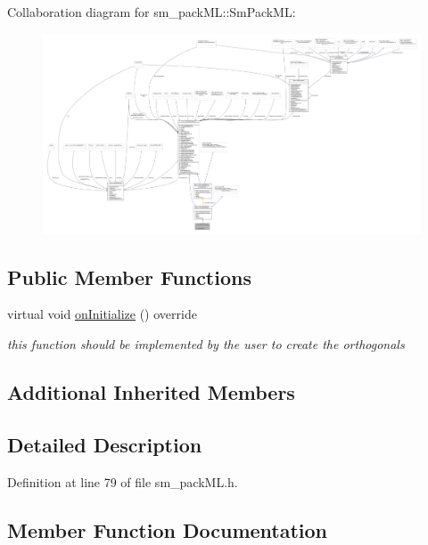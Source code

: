 Collaboration diagram for sm\+\_\+pack\+ML\+:\+:Sm\+Pack\+ML\+:
\nopagebreak
\begin{figure}[H]
\begin{center}
\leavevmode
\includegraphics[width=350pt]{structsm__packML_1_1SmPackML__coll__graph}
\end{center}
\end{figure}
\subsection*{Public Member Functions}
\begin{DoxyCompactItemize}
\item 
virtual void \hyperlink{structsm__packML_1_1SmPackML_a63aa0e31bcdf6c9584011d14bc6ec8af}{on\+Initialize} () override
\begin{DoxyCompactList}\small\item\em this function should be implemented by the user to create the orthogonals \end{DoxyCompactList}\end{DoxyCompactItemize}
\subsection*{Additional Inherited Members}


\subsection{Detailed Description}


Definition at line 79 of file sm\+\_\+pack\+M\+L.\+h.



\subsection{Member Function Documentation}
\mbox{\label{structsm__packML_1_1SmPackML_a63aa0e31bcdf6c9584011d14bc6ec8af}} 
